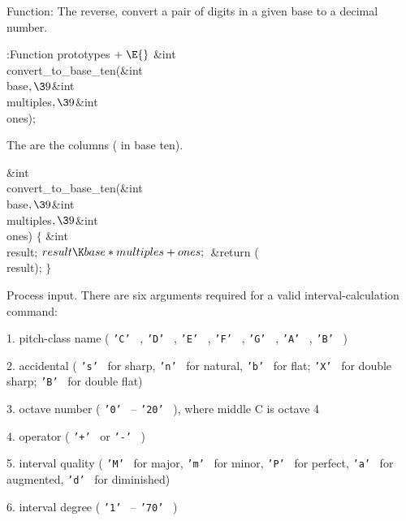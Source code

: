 Function: The reverse, convert a pair of digits in a given base to a
decimal number.

\Y\B\4:Function prototypes\X${}\mathrel+\E{}$\6
\&{int} \\{convert\_to\_base\_ten}(\&{int} \\{base}${},\39{}$\&{int} %
\\{multiples}${},\39{}$\&{int} \\{ones});\par
\fi

The  are the  columns ( in base ten).

\Y\B\&{int} \\{convert\_to\_base\_ten}(\&{int} \\{base}${},\39{}$\&{int} %
\\{multiples}${},\39{}$\&{int} \\{ones})\1\1\2\2\6
${}\{{}$\1\6
\&{int} \\{result};\7
${}\\{result}\K\\{base}*\\{multiples}+\\{ones};{}$\6
\&{return} (\\{result});\6
\4${}\}{}$\2\par
\fi

Process input.
There are six arguments required for a valid interval-calculation command:

\def\ttchar #1{%
{\tt '#1'}\ %
}

\item{1.} pitch-class name (\ttchar{C}, \ttchar{D}, \ttchar{E},
\ttchar{F}, \ttchar{G}, \ttchar{A}, \ttchar{B})
\item{2.} accidental (\ttchar{s} for sharp, \ttchar{n} for natural,
\ttchar{b} for flat; \ttchar{X} for double sharp; \ttchar{B} for double flat)
\item{3.} octave number (\ttchar{0}--\ttchar{20}), where middle C is octave 4
\item{4.} operator (\ttchar{+} or \ttchar{-})
\item{5.} interval quality (\ttchar{M} for major, \ttchar{m} for minor,
\ttchar{P} for perfect, \ttchar{a} for augmented, \ttchar{d} for diminished)
\item{6.} interval degree (\ttchar{1}--\ttchar{70})

